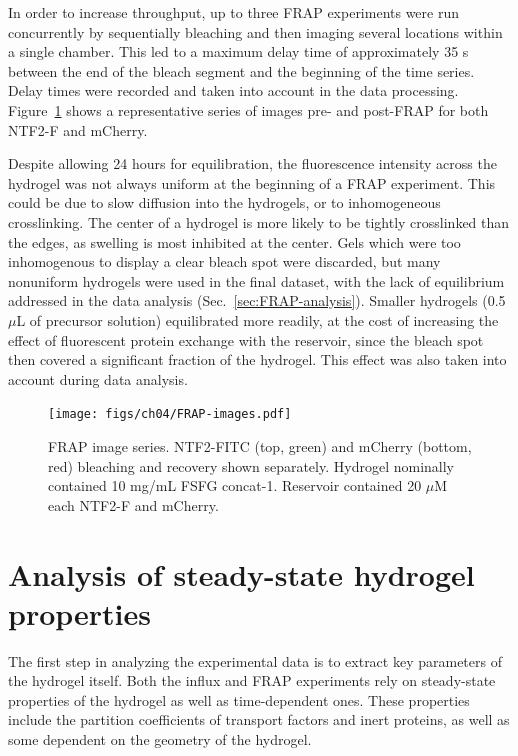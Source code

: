 In order to increase throughput, up to three FRAP experiments were run concurrently by sequentially bleaching and then imaging several locations within a single chamber.  This led to a maximum delay time of approximately 35 s between the end of the bleach segment and the beginning of the time series.  Delay times were recorded and taken into account in the data processing. Figure~\ref{fig:frap-images} shows a representative series of images pre- and post-FRAP for both NTF2-F and mCherry.

Despite allowing 24 hours for equilibration, the fluorescence intensity across the hydrogel was not always uniform at the beginning of a FRAP experiment.  This could be due to slow diffusion into the hydrogels, or to inhomogeneous crosslinking.  The center of a hydrogel is more likely to be tightly crosslinked than the edges, as swelling is most inhibited at the center.  Gels which were too inhomogenous to display a clear bleach spot were discarded, but many nonuniform hydrogels were used in the final dataset, with the lack of equilibrium addressed in the data analysis (Sec.~\ref{sec:FRAP-analysis}).  Smaller hydrogels (0.5 $\mu$L of precursor solution) equilibrated more readily, at the cost of increasing the effect of fluorescent protein exchange with the reservoir, since the bleach spot then covered a significant fraction of the hydrogel.  This effect was also taken into account during data analysis.

\begin{figure} 
\caption[FRAP image series.]{FRAP image series. NTF2-FITC (top, green) and mCherry (bottom, red) bleaching and recovery shown separately.  Hydrogel nominally contained 10 mg/mL FSFG concat-1.  Reservoir contained 20 $\mu$M each NTF2-F and mCherry. }
\centering
\texttt{[image: figs/ch04/FRAP-images.pdf]}
\label{fig:frap-images}
\end{figure} 

\section{Analysis of steady-state hydrogel properties}

The first step in analyzing the experimental data is to extract key parameters of the hydrogel itself.  Both the influx and FRAP experiments rely on steady-state properties of the hydrogel as well as time-dependent ones.  These properties include the partition coefficients of transport factors and inert proteins, as well as some dependent on the geometry of the hydrogel.

